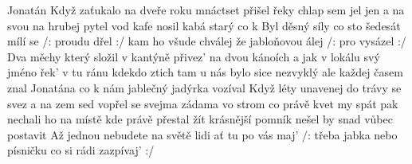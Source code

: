 \begin{TEXT}{Jonatán}
\SLOKA Když  zaťukalo na dveře roku mnáctset \NL
přišel  řeky chlap  sem jel jen  a na svou  \NL
na  hrubej pytel vod kafe nosil  kabá \NL
starý   co k    
\REFREN  Byl  děsný síly co sto šedesát mílí se \NL
/:  proudu dřel :/ \NL
kam  ho všude chválej že jabloňovou álej \NL
/: pro  vysázel :/    
\SLOKA Dva měchy který složil v kantýně přivez' na dvou kánoích \NL
a jak v lokálu svý jméno řek' v tu ránu kdekdo ztich \NL
tam u nás bylo sice nezvyklý ale každej časem znal \NL
Jonatána co k nám jablečný jadýrka vozíval 
\SLOKA Když léty unavenej do trávy se svez a na zem sed \NL
vopřel se svejma zádama vo strom co právě kvet \NL
my spát pak nechali ho na místě kde právě přestal žít \NL
krásnější pomník nešel by snad vůbec postavit 
\SLOKA Až jednou nebudete na světě lidi ať tu po vás maj' \NL
/: třeba jabka nebo písničku co si rádi zazpívaj' :/ 
\end{TEXT}
